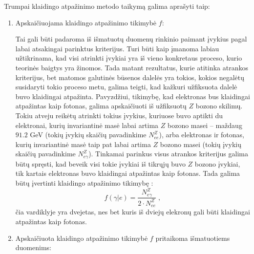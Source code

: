 \documentclass[a4paper, 12pt]{article}
\newlength\q
\begin{document}
Trumpai klaidingo atpažinimo metodo taikymą galima aprašyti taip:
\begin{enumerate}
\item Apskaičiuojama klaidingo atpažinimo tikimybė $f$:

Tai gali būti padaroma iš išmatuotų duomenų rinkinio paimant įvykius pagal labai atsakingai parinktus kriterijus. Turi būti kaip įmanoma labiau užtikrinama, kad visi atrinkti įvykiai yra iš vieno konkretaus proceso, kurio teorinės baigtys yra žinomos. Tada matant rezultatus, kurie atitinka atrankos kriterijus, bet matomos galutinės būsenos dalelės yra tokios, kokios negalėtų susidaryti tokio proceso metu, galima teigti, kad kažkuri užfiksuota dalelė buvo klaidingai atpažinta. Pavyzdžiui, tikimybę, kad elektronas bus klaidingai atpažintas kaip fotonas, galima apskaičiuoti iš užfiksuotų $Z$ bozono skilimų. Tokiu atveju reikėtų atrinkti tokius įvykius, kuriuose buvo aptikti du elektronai, kurių invariantinė masė labai artima $Z$ bozono masei -- maždaug $91.2$ GeV (tokių įvykių skaičių pavadinkime $N_{ee}^{Z}$), arba elektronas ir fotonas, kurių invariantinė masė taip pat labai artima $Z$ bozono masei (tokių įvykių skaičių pavadinkime $N_{e\gamma}^{Z}$). Tinkamai parinkus visus atrankos kriterijus galima būtų spręsti, kad beveik visi tokie įvykiai iš tikrųjų buvo $Z$ bozono įvykiai, tik kartais elektronas buvo klaidingai atpažintas kaip fotonas. Tada galima būtų įvertinti klaidingo atpažinimo tikimybę \cite{FakeRateZ}:
\begin{equation}
f(\gamma|e) = \frac{N_{e\gamma}^{Z}}{2\cdot N_{ee}^{Z}} \; \mathrm{,}
\label{eq:frCalc}
\end{equation}
čia vardiklyje yra dvejetas, nes bet kuris iš dviejų elekronų gali būti klaidingai atpažintas kaip fotonas.
\item Apskaičiuota klaidingo atpažinimo tikimybė $f$ pritaikoma išmatuotiems duomenims:


\end{enumerate}
\end{document}
